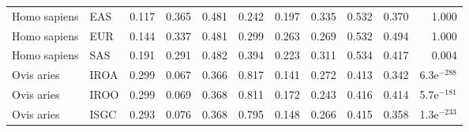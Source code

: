 \begin{center}
\begin{adjustbox}{width = 1\textwidth}
\begin{tabular}{llrrrrrrrrr}
        Homo sapiens &                       EAS &                              0.117 &                               0.365 &                 0.481 &                 0.242 &                              0.197 &                               0.335 &                 0.532 &                 0.370 &         1.000 \\
        Homo sapiens &                       EUR &                              0.144 &                               0.337 &                 0.481 &                 0.299 &                              0.263 &                               0.269 &                 0.532 &                 0.494 &         1.000 \\
        Homo sapiens &                       SAS &                              0.191 &                               0.291 &                 0.482 &                 0.394 &                              0.223 &                               0.311 &                 0.534 &                 0.417 &         0.004 \\
          Ovis aries &                      IROA &                              0.299 &                               0.067 &                 0.366 &                 0.817 &                              0.141 &                               0.272 &                 0.413 &                 0.342 & 6.3e$^{-288}$ \\
          Ovis aries &                      IROO &                              0.299 &                               0.069 &                 0.368 &                 0.811 &                              0.172 &                               0.243 &                 0.416 &                 0.414 & 5.7e$^{-181}$ \\
          Ovis aries &                      ISGC &                              0.293 &                               0.076 &                 0.368 &                 0.795 &                              0.148 &                               0.266 &                 0.415 &                 0.358 & 1.3e$^{-233}$ \\
\bottomrule
\end{tabular}
\end{adjustbox}
\end{center}
